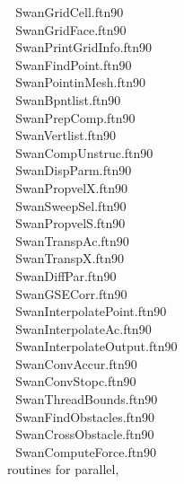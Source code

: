\documentclass[12pt]{book}
\begin{document}
\begin{tabbing}
                          \> $\,\,$ SwanGridCell.ftn90 \\
                          \> $\,\,$ SwanGridFace.ftn90 \\
                          \> $\,\,$ SwanPrintGridInfo.ftn90 \\
                          \> $\,\,$ SwanFindPoint.ftn90 \\
                          \> $\,\,$ SwanPointinMesh.ftn90 \\
                          \> $\,\,$ SwanBpntlist.ftn90 \\
                          \> $\,\,$ SwanPrepComp.ftn90 \\
                          \> $\,\,$ SwanVertlist.ftn90 \\
                          \> $\,\,$ SwanCompUnstruc.ftn90 \\
                          \> $\,\,$ SwanDispParm.ftn90 \\
                          \> $\,\,$ SwanPropvelX.ftn90 \\
                          \> $\,\,$ SwanSweepSel.ftn90 \\
                          \> $\,\,$ SwanPropvelS.ftn90 \\
                          \> $\,\,$ SwanTranspAc.ftn90 \\
                          \> $\,\,$ SwanTranspX.ftn90 \\
                          \> $\,\,$ SwanDiffPar.ftn90 \\
                          \> $\,\,$ SwanGSECorr.ftn90 \\
                          \> $\,\,$ SwanInterpolatePoint.ftn90 \\
                          \> $\,\,$ SwanInterpolateAc.ftn90 \\
                          \> $\,\,$ SwanInterpolateOutput.ftn90 \\
                          \> $\,\,$ SwanConvAccur.ftn90 \\
                          \> $\,\,$ SwanConvStopc.ftn90 \\
                          \> $\,\,$ SwanThreadBounds.ftn90 \\
                          \> $\,\,$ SwanFindObstacles.ftn90 \\
                          \> $\,\,$ SwanCrossObstacle.ftn90 \\
                          \> $\,\,$ SwanComputeForce.ftn90 \\
routines for parallel,    \> $\,\,$ \\

\end{tabbing}
\end{document}
